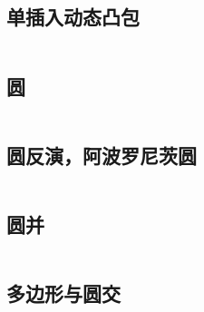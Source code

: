 				\subsection{单插入动态凸包}
				\inputminted{cpp}{src/Geometry/dynamic_convex_hull.cpp}

				\subsection{圆}
					\inputminted[highlightlines={7}]{cpp}{src/Geometry/circle.cpp}
				\subsection{圆反演，阿波罗尼茨圆}
				\begin{small}
					
				\end{small}
					\inputminted{cpp}{src/yzh/circle_inversion.cpp}
				\subsection{圆并}
					\inputminted{cpp}{src/Geometry/圆并.cpp}
				\subsection{多边形与圆交}
					\inputminted{cpp}{src/Geometry/多边形和圆的交.cpp}


